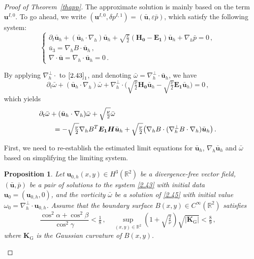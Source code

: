 \documentclass[pdflatex,sn-mathphys-num]{sn-jnl}%
\theoremstyle{thmstyleone}%
\newtheorem{proposition}[theorem]{Proposition}%
\theoremstyle{thmstyletwo}%
\theoremstyle{thmstylethree}%
\theoremstyle{thmstyletwo}
\begin{document}
\begin{proof}[Proof of Theorem~{\upshape\ref{thapp}}]
The approximate solution is mainly based on the term  $\boldsymbol{u}^{I,0}$. To go ahead, we write $(\boldsymbol{u}^{I,0},\delta p^{I,1})=(\bar{\boldsymbol{u}},\varepsilon\bar{p})$, which satisfy the 
following system:
\begin{equation}\label{2.43}
	\begin{cases}
		\partial_{t} \bar {\boldsymbol u}_h+(\bar {\boldsymbol u}_h \cdot \nabla_h) \bar {\boldsymbol u}_h
		+\sqrt{\frac{\nu}{2}}
		(\boldsymbol{H_0}
		-\boldsymbol{E_1})
		\bar{\boldsymbol u}_h+\nabla_h\bar p=0\,,\\
		\bar u_3=\nabla_h{B}\cdot\bar{\boldsymbol{u}}_h\,,\\
		\nabla\cdot \bar{\boldsymbol u}=\nabla_h \cdot \bar{\boldsymbol u}_h=0\,.
	\end{cases}
\end{equation}

By applying $\nabla_h^\bot \cdot $ to $\eqref{2.43}_{1}$, and denoting $\bar{\omega}=\nabla_h^\bot \cdot \bar {\boldsymbol u}_h$, we have 
\begin{equation}\label{2.44}
	\partial_t\bar{\omega}+(\bar {\boldsymbol u}_h\cdot\nabla_h) {\bar{\omega}}
	+\nabla^\bot_h\cdot\big(\sqrt{\tfrac{\nu}{2}}
	\boldsymbol{H_0}
	\bar{\boldsymbol u}_h
	-\sqrt{\tfrac{\nu}{2}}\boldsymbol{E_1}\bar{\boldsymbol u}_h\big)
	=0\,,
\end{equation}
which yields
\begin{align}\label{2.45}
	&\partial_t\bar{\omega}+(\bar {\boldsymbol u}_h\cdot\nabla_h) {\bar{\omega}}
	+\sqrt{\tfrac{\nu}{2}}\bar{\omega}\notag\\
	&\qquad=-\sqrt{\tfrac{\nu}{2}}
	\nabla_hB^T\boldsymbol{E_1}
	\boldsymbol{H}
	\bar{\boldsymbol{u}}_h
	+\sqrt{\tfrac{\nu}{2}}
	\big(
\nabla_hB\cdot(\nabla_h^\bot B\cdot\nabla_h)\bar{\boldsymbol{u}}_h
	\big)\,.
\end{align}


First, we need to re-establish the estimated limit equations for $\bar{\boldsymbol{u}}_h$, $\nabla_{ h}\bar{\boldsymbol{u}}_h$ and $\bar{{\omega}}$ based on simplifying the limiting system.
\begin{proposition}\label{lem1}
	Let $ {\boldsymbol u}_{0,h}(x,y) \in{H}^{3}(\mathbb{R}^2) $ be a divergence-free vector field,   $(\bar{\boldsymbol u},\bar p)$ be a pair of solutions to the system \eqref{2.43} with initial data $ {\boldsymbol u}_0=( {\boldsymbol u}_{0,h},0)$,
	and the vorticity $\bar{\omega}$ be a solution of \eqref{2.45} with initial value ${{\omega}_0=\nabla_h^{\bot}\cdot {\boldsymbol u}_{0,h}}$.
	Assume that the boundary surface $B(x,y)\in C^\infty(\mathbb{R}^2)$ satisfies 	
	\begin{equation}\label{2.46}
		\frac{\cos^2\alpha+\cos^2\beta}{\cos^2\gamma}<\tfrac{1}{8}\,,
		\quad  
		\sup\limits_{(x,y)\in \mathbb{R}^2} (1+\sqrt{\tfrac{2}{\nu}})\sqrt{\big| \boldsymbol{K}_{\mathrm{G}}\big|} <\tfrac{8}{9}\,,
	\end{equation}
where   $\boldsymbol{K}_{\mathrm{G}}$ is  the Gaussian curvature of $B(x,y)$.
	

\end{proposition}
\end{proof}
\end{document}
